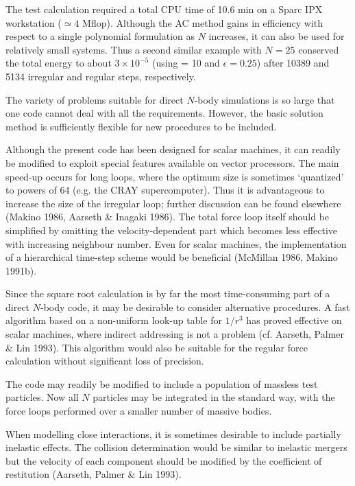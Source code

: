    The test calculation required a total CPU time of 10.6 min on a Sparc
IPX workstation ($\simeq 4$ Mflop).
Although the AC method gains in efficiency with respect to a single polynomial
formulation as $N$ increases, it can also be used for relatively small
systems.
Thus a second similar example with $N = 25$ conserved the total energy to
about $3 \times 10^{-5}$ (using  = 10 and $\epsilon = 0.25$)
after 10389 and 5134 irregular and regular steps, respectively.

The variety of problems suitable for direct $N$-body simulations
is so large that one code cannot deal with all the requirements.
However, the basic solution method is sufficiently flexible for new
procedures to be included.

   Although the present code has been designed for scalar machines, it can
readily be modified to exploit special features available on
vector processors.
The main speed-up occurs for long loops, where the optimum
size is sometimes `quantized' to powers of 64 (e.g. the CRAY supercomputer).
Thus it is advantageous to increase the size of the irregular loop;
further discussion can be found elsewhere (Makino 1986,
Aarseth \& Inagaki 1986).
The total force loop itself should be simplified by omitting
the velocity-dependent part which becomes less effective with
increasing neighbour number.
Even for scalar machines, the implementation of a hierarchical time-step scheme
would be beneficial (McMillan 1986, Makino 1991b).

   Since the square root calculation is by far the most time-consuming part
of a direct $N$-body code, it may be desirable to consider alternative
procedures.
A fast algorithm based on a non-uniform look-up table for $1/r^3$ has proved
effective on scalar machines, where indirect addressing is not a problem
(cf. Aarseth, Palmer \& Lin 1993).
This algorithm would also be suitable
for the regular force calculation without significant loss of precision.

The code may readily be modified to include a population of massless test
particles.
Now all $N$ particles may be integrated in the standard way, with
the force loops performed over a smaller number of massive bodies.

   When modelling close interactions, it is sometimes desirable to include
partially inelastic effects.
The collision determination would be similar to inelastic
mergers but the velocity of each component should be modified by the
coefficient of restitution (Aarseth, Palmer \& Lin 1993).

